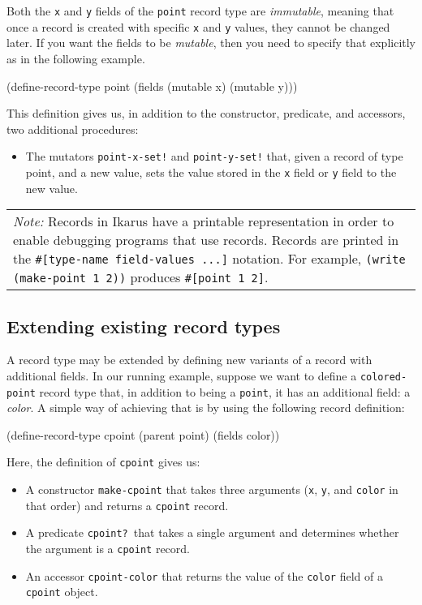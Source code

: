 \documentclass[onecolumn, 12pt, twoside, openright, dvipdfm]{book}
\newcommand{\BoxedText}[2]{
  \vspace{.05in}
  \begin{center}
    \begin{tabular}{|p{4.6in}|} {\large \emph{#1}} #2 \end{tabular}
  \end{center}
  \vspace{.05in}
}
\begin{document}
Both the \texttt{x} and \texttt{y} fields of the \texttt{point}
record type are \emph{immutable}, meaning that once a record is
created with specific \texttt{x} and \texttt{y} values, they cannot
be changed later.  If you want the fields to be \emph{mutable}, then
you need to specify that explicitly as in the following example.
\newpage

\begin{CodeInline}
(define-record-type point
  (fields (mutable x) (mutable y)))
\end{CodeInline}

This definition gives us, in addition to the constructor, predicate,
and accessors, two additional procedures:
\begin{itemize}
\item The mutators \texttt{point-x-set!} and \texttt{point-y-set!} that,
given a record of type point, and a new value, sets the value stored in the
\texttt{x} field or \texttt{y} field to the new value.
\end{itemize}


\BoxedText{Note:}{Records in Ikarus have a printable representation
in order to enable debugging programs that use records.  Records are
printed in the \texttt{\#[type-name field-values ...]} notation.
For example, \texttt{(write (make-point 1 2))} produces 
\texttt{\#[point 1 2]}.}

\subsection{Extending existing record types}

A record type may be extended by defining new variants of a record
with additional fields.  In our running example, suppose we want
to define a \texttt{colored-point} record type that, in addition to
being a \texttt{point}, it has an additional field: a \emph{color}.
A simple way of achieving that is by using the following record 
definition:

\begin{CodeInline}
(define-record-type cpoint
  (parent point)
  (fields color))
\end{CodeInline}

Here, the definition of \texttt{cpoint} gives us:
\begin{itemize}
\item A constructor \texttt{make-cpoint} that takes three arguments
(\texttt{x}, \texttt{y}, and \texttt{color} in that order) and returns a
\texttt{cpoint} record.
\item A predicate \texttt{cpoint?}\ that takes a single argument and
determines whether the argument is a \texttt{cpoint} record.
\item An accessor \texttt{cpoint-color} that returns the value of
the \texttt{color} field of a \texttt{cpoint} object.
\end{itemize}
\end{document}
